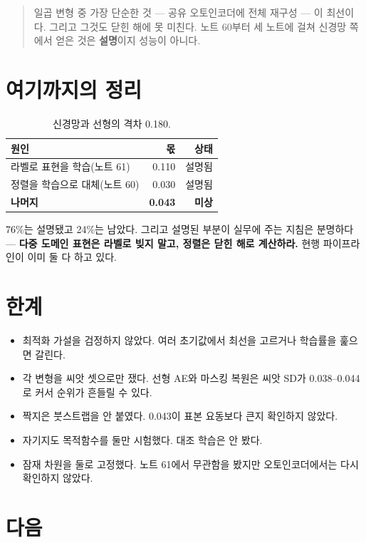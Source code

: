 \documentclass[10pt]{article}
\begin{document}
\begin{quote}\fontsize{9.5}{11.5}\selectfont
일곱 변형 중 가장 단순한 것 --- 공유 오토인코더에 전체 재구성 --- 이 최선이다.
그리고 그것도 닫힌 해에 못 미친다. 노트 60부터 세 노트에 걸쳐 신경망 쪽에서
얻은 것은 \textbf{설명}이지 성능이 아니다.
\end{quote}

\section{여기까지의 정리}

\begin{table}[t]
\centering\tsize
\caption{신경망과 선형의 격차 0.180.}
\begin{tabular}{lrr}
\toprule
원인 & 몫 & 상태 \\
\midrule
라벨로 표현을 학습(노트 61) & 0.110 & 설명됨 \\
정렬을 학습으로 대체(노트 60) & 0.030 & 설명됨 \\
\textbf{나머지} & \textbf{0.043} & \textbf{미상} \\
\bottomrule
\end{tabular}
\end{table}

76\%는 설명됐고 24\%는 남았다. 그리고 설명된 부분이 실무에 주는 지침은
분명하다 --- \textbf{다중 도메인 표현은 라벨로 빚지 말고, 정렬은 닫힌 해로
계산하라.} 현행 파이프라인이 이미 둘 다 하고 있다.

\section{한계}

\begin{itemize}[leftmargin=1.1em,itemsep=0.15em]
\item 최적화 가설을 검정하지 않았다. 여러 초기값에서 최선을 고르거나 학습률을
      훑으면 갈린다.
\item 각 변형을 씨앗 셋으로만 쟀다. 선형 AE와 마스킹 복원은 씨앗 SD가
      0.038--0.044로 커서 순위가 흔들릴 수 있다.
\item 짝지은 붓스트랩을 안 붙였다. 0.043이 표본 요동보다 큰지 확인하지 않았다.
\item 자기지도 목적함수를 둘만 시험했다. 대조 학습은 안 봤다.
\item 잠재 차원을 둘로 고정했다. 노트 61에서 무관함을 봤지만 오토인코더에서는
      다시 확인하지 않았다.
\end{itemize}

\section{다음}
\end{document}
